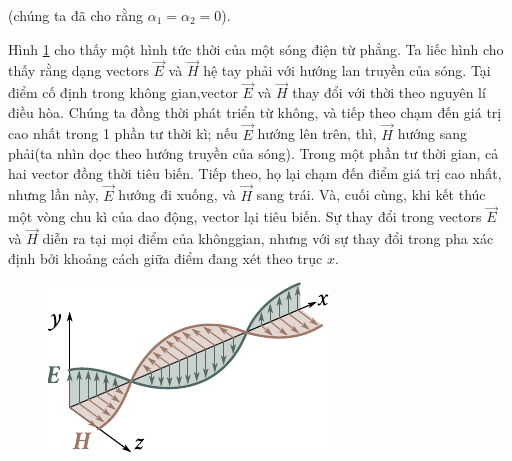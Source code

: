 \noindent
(chúng ta đã cho rằng $\alpha_1=\alpha_2=0$).

Hình \ref{fig:15_1} cho thấy một hình tức thời của một sóng điện từ phẳng.
Ta liếc hình cho thấy rằng dạng vectors $\vec{E}$ và $\vec{H}$ hệ tay phải với hướng lan truyền của sóng.
Tại điểm cố định trong không gian,vector $\vec{E}$ và $\vec{H}$ thay đổi với thời theo nguyên lí điều hòa.
Chúng ta đồng thời phát triển từ không, và tiếp theo chạm đến giá trị cao nhất trong 1 phần tư thời kì; nếu $\vec{E}$ hướng lên trên, thì, $\vec{H}$ hướng sang phải(ta nhìn dọc theo hướng truyền của sóng).
Trong một phần tư thời gian, cả hai vector đồng thời tiêu biến.
Tiếp theo, họ lại chạm đến điểm giá trị cao nhất, nhưng lần này, $\vec{E}$ hướng đi xuống, và $\vec{H}$ sang trái.
Và, cuối cùng, khi kết thúc một vòng chu kì của dao động, vector lại tiêu biến.
Sự thay đổi trong vectors $\vec{E}$ và $\vec{H}$ diễn ra tại mọi điểm của khônggian, nhưng với sự thay đổi trong pha xác định bởi khoảng cách giữa điểm đang xét theo trục $x$.

\begin{figure}[!htb]
	\begin{center}
		\includegraphics[scale=1]{figures/ch_15/fig_15_1.pdf}
		\caption[]{}
		\label{fig:15_1}
	\end{center}
	\vspace{-0.8cm}
\end{figure}

